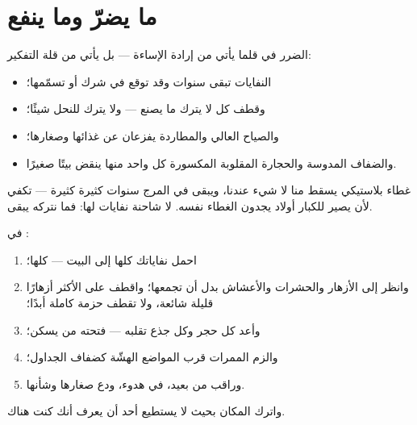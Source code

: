 \section{ما يضرّ وما ينفع}

\begin{proposition}\label{prop:g2:caring-for-nature:harm}
الضرر في  قلما يأتي من إرادة الإساءة --- بل يأتي من قلة
التفكير:
\begin{itemize}
  \item النفايات تبقى سنوات وقد توقع  في شرك أو تسمّمها؛
  \item وقطف كل  لا يترك ما يصنع  --- ولا يترك للنحل
        شيئًا؛
  \item والصياح العالي والمطاردة يفزعان  عن غذائها
        وصغارها؛
  \item والضفاف المدوسة والحجارة المقلوبة  المكسورة كل
        واحد منها ينقض بيتًا صغيرًا.
\end{itemize}
\end{proposition}
\admitted

\begin{example}\label{ex:g2:caring-for-nature:cap}
غطاء بلاستيكي يسقط منا لا شيء عندنا، ويبقى في المرج سنوات كثيرة
كثيرة --- تكفي لأن يصير للكبار أولاد يجدون الغطاء نفسه. 
لا شاحنة نفايات لها: فما نتركه يبقى.
\end{example}

\begin{method}\label{met:g2:caring-for-nature:rules}
في :
\begin{enumerate}
  \item احمل نفاياتك كلها إلى البيت --- كلها؛
  \item وانظر إلى الأزهار والحشرات والأعشاش بدل أن تجمعها؛ واقطف
        على الأكثر أزهارًا قليلة شائعة، ولا تقطف حزمة كاملة أبدًا؛
  \item وأعد كل حجر وكل جذع تقلبه --- فتحته من يسكن؛
  \item والزم الممرات قرب المواضع الهشّة كضفاف الجداول؛
  \item وراقب  من بعيد، في هدوء، ودع صغارها وشأنها.
\end{enumerate}
واترك المكان بحيث لا يستطيع أحد أن يعرف أنك كنت هناك.
\end{method}


